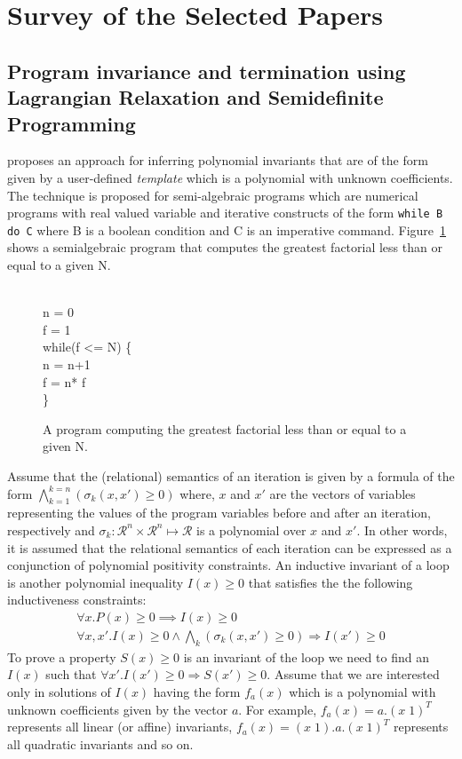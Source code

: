 \newcommand{\real}{\mathcal{R}}

\section{Survey of the Selected Papers}

\subsection{Program invariance and termination using Lagrangian Relaxation and Semidefinite Programming}

\cite{cousot:VMCAI05} proposes an approach for inferring polynomial invariants that 
are of the form given by a user-defined \emph{template} which is a polynomial with unknown coefficients.
The technique is proposed for semi-algebraic programs which are numerical programs with real valued variable 
and iterative constructs of the form \texttt{while B do C} where B is a boolean condition 
and C is an imperative command. Figure~\ref{fig:SAprogram} shows a semialgebraic program that computes the greatest
factorial less than or equal to a given N.
%
\begin{figure}
\begin{myprogram}
\\
\pnl \>  n = 0 \\
\pnl \> f = 1 \\
\pnl \> while(f <= N) \{ \\
\pnl \> \> n = n+1 \\
\pnl \> \> f = n* f \\
\pnl \> \}
\end{myprogram}
\caption{A program computing the greatest factorial less than or equal to a given N.} \label{fig:SAprogram}
\end{figure}
%
Assume that the (relational) semantics of an iteration is given by a formula of the form
$\bigwedge \limits_{k=1}^{k=n} (\sigma_k(x,x') \ge 0)$ where, $x$ and $x'$ are the vectors of
variables representing the values of the program variables before and after an iteration, respectively 
and $\sigma_k : \real^n \times \real^n \mapsto \real$ is a polynomial over $x$ and $x'$. 
In other words, it is assumed that the relational semantics of each
iteration can be expressed as a conjunction of polynomial positivity constraints.
An inductive invariant of a loop is another polynomial inequality $I(x) \ge 0$ that satisfies the
the following inductiveness constraints:
%
\begin{align}
\forall x. P(x) \ge 0 \implies I(x) \ge 0 \\
\forall x,x'. I(x) \ge 0 \wedge \bigwedge_k (\sigma_k(x,x') \ge 0) \Rightarrow  I(x') \ge 0
\end{align}
%
To prove a property $S(x) \ge 0$ is an invariant of the loop we need to find an $I(x)$ such that
$\forall x'. I(x') \ge 0 \Rightarrow S(x') \ge 0$.
Assume that we are interested only in solutions of $I(x)$ having the form $f_a(x)$ which is a polynomial with 
unknown coefficients given by the vector $a$. 
For example, $f_a(x) = a.(x \; 1)^T$ represents all linear (or affine) invariants, 
$f_a(x) = (x \; 1).a.(x \; 1)^T$ represents all quadratic invariants  and so on. 

